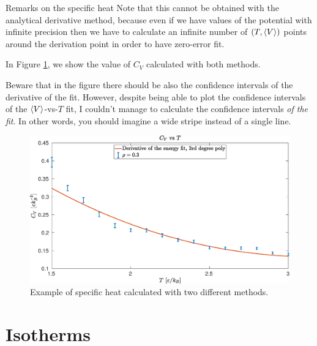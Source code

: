 \documentclass[10pt, compress, protectframetitle, handout]{beamer}
\begin{document}
\begin{frame}[allowframebreaks]{Remarks on the specific heat}
	Note that this cannot be obtained with the analytical derivative method, because even if we have values of the potential with infinite precision then we have to calculate an infinite number of $(T,\Braket{V})$ points around the derivation point in order to have zero-error fit.
	
	In Figure \ref{fig:Cv_comparison}, we show the value of $C_V$ calculated with both methods.
	
	Beware that in the figure there should be also the \alert{confidence intervals} of the derivative of the fit. However, despite being able to plot the confidence intervals of the $\Braket{V}$-vs-$T$ fit, I couldn't manage to calculate the confidence intervals \emph{of the fit}. In other words, you should imagine a wide \alert{stripe} instead of a single line.
	
	\begin{figure}
		\centering
		\includegraphics[width=\textwidth]{Fluctuations_vs_Analytical}
		\caption{Example of specific heat calculated with two different methods.}
		\label{fig:Cv_comparison}
	\end{figure}
	
\end{frame}


\section{Isotherms}
\end{document}
